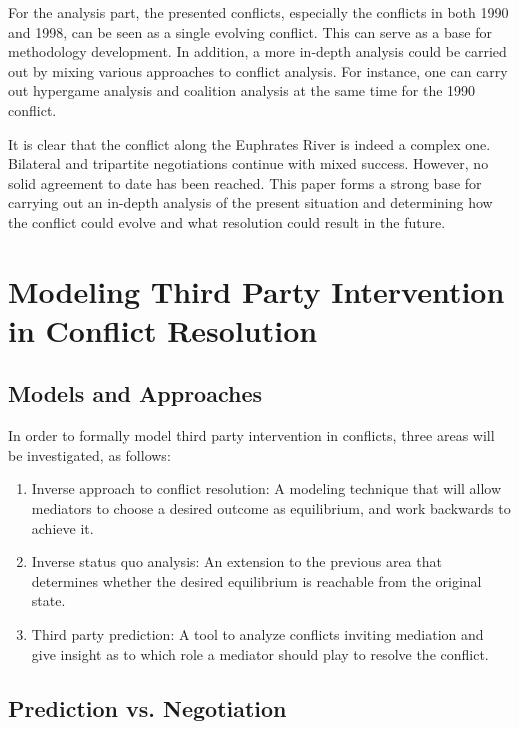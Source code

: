 \documentclass[letterpaper,12pt,titlepage,oneside,final]{book}
\begin{document}
For the analysis part, the presented conflicts, especially the conflicts in both 1990 and 1998, can be seen as a single evolving conflict. This can serve as a base for methodology development. In addition, a more in-depth analysis could be carried out by mixing various approaches to conflict analysis. For instance, one can carry out hypergame analysis and coalition analysis at the same time for the 1990 conflict.

It is clear that the conflict along the Euphrates River is indeed a complex one. Bilateral and tripartite negotiations continue with mixed success. However, no solid agreement to date has been reached. This paper forms a strong base for carrying out an in-depth analysis of the present situation and determining how the conflict could evolve and what resolution could result in the future. 



\chapter{Modeling Third Party Intervention in Conflict Resolution}

\section{Models and Approaches}

In order to formally model third party intervention in conflicts, three areas will be investigated, as follows:
\begin{enumerate}
\item Inverse approach to conflict resolution: A modeling technique that will allow mediators to choose a desired outcome as equilibrium, and work backwards to achieve it.
\item Inverse status quo analysis: An extension to the previous area that determines whether the desired equilibrium is reachable from the original state.
\item Third party prediction: A tool to analyze conflicts inviting mediation and give insight as to which role a mediator should play to resolve the conflict.

\end{enumerate}

\section{Prediction vs. Negotiation}
\end{document}
